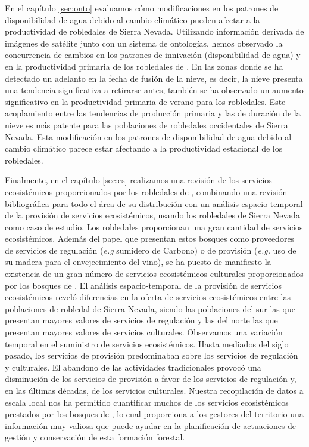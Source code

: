 En el \textcolor{ctcolormain}{capítulo \ref{sec:onto}} evaluamos cómo modificaciones en los patrones de disponibilidad de agua debido al cambio climático pueden afectar a la productividad de robledales de Sierra Nevada. Utilizando información derivada de imágenes de satélite junto con un sistema de ontologías, hemos observado la concurrencia de cambios en los patrones de innivación (disponibilidad de agua) y en la productividad primaria de los robledales de \Qp. En las zonas donde se ha detectado un adelanto en la fecha de fusión de la nieve, es decir, la nieve presenta una tendencia significativa a retirarse antes, también se ha observado un aumento significativo en la productividad primaria de verano para los robledales. Este acoplamiento entre las tendencias de producción primaria y las de duración de la nieve es más patente para las poblaciones de robledales occidentales de Sierra Nevada. Esta modificación en los patrones de disponibilidad de agua debido al cambio climático parece estar afectando a la productividad estacional de los robledales. 

Finalmente, en el \textcolor{ctcolormain}{capítulo \ref{sec:es}} realizamos una revisión de los servicios ecosistémicos proporcionados por los robledales de \Qp, combinando una revisión bibliográfica para todo el área de su distribución con un análisis espacio-temporal de la provisión de servicios ecosistémicos, usando los robledales de Sierra Nevada como caso de estudio. Los robledales proporcionan una gran cantidad de servicios ecosistémicos. Además del papel que presentan estos bosques como proveedores de servicios de regulación (\emph{e.g} sumidero de Carbono) o de provisión (\emph{e.g.} uso de su madera para el envejecimiento del vino), se ha puesto de manifiesto la existencia de un gran número de servicios ecosistémicos culturales proporcionados por los bosques de \Qp. El análisis espacio-temporal de la provisión de servicios ecosistémicos reveló diferencias en la oferta de servicios ecosistémicos entre las poblaciones de robledal de Sierra Nevada, siendo las poblaciones del sur las que presentan mayores valores de servicios de regulación y las del norte las que presentan mayores valores de servicios culturales. Observamos una variación temporal en el suministro de servicios ecosistémicos. Hasta mediados del siglo pasado, los servicios de provisión predominaban sobre los servicios de regulación y culturales. El abandono de las actividades tradicionales provocó una disminución de los servicios de provisión a favor de los servicios de regulación y, en las últimas décadas, de los servicios culturales. Nuestra recopilación de datos a escala local nos ha permitido cuantificar muchos de los servicios ecosistémicos prestados por los bosques de \Qp, lo cual proporciona a los gestores del territorio una información muy valiosa que puede ayudar en la planificación de actuaciones de gestión y conservación de esta formación forestal. 


